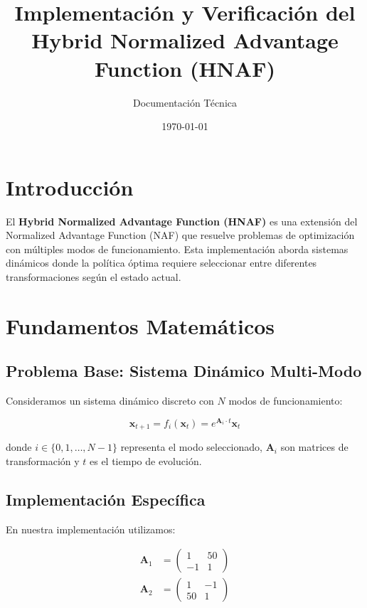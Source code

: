 \documentclass[12pt,a4paper]{article}
\title{\textbf{Implementación y Verificación del\\Hybrid Normalized Advantage Function (HNAF)}}
\author{Documentación Técnica}
\date{\today}
\begin{document}
\maketitle

\tableofcontents
\newpage

\section{Introducción}

El \textbf{Hybrid Normalized Advantage Function (HNAF)} es una extensión del Normalized Advantage Function (NAF) que resuelve problemas de optimización con múltiples modos de funcionamiento. Esta implementación aborda sistemas dinámicos donde la política óptima requiere seleccionar entre diferentes transformaciones según el estado actual.

\section{Fundamentos Matemáticos}

\subsection{Problema Base: Sistema Dinámico Multi-Modo}

Consideramos un sistema dinámico discreto con $N$ modos de funcionamiento:

\begin{equation}
\mathbf{x}_{t+1} = f_i(\mathbf{x}_t) = e^{\mathbf{A}_i \cdot t} \mathbf{x}_t
\end{equation}

donde $i \in \{0, 1, \ldots, N-1\}$ representa el modo seleccionado, $\mathbf{A}_i$ son matrices de transformación y $t$ es el tiempo de evolución.

\subsection{Implementación Específica}

En nuestra implementación utilizamos:

\begin{align}
\mathbf{A}_1 &= \begin{pmatrix} 1 & 50 \\ -1 & 1 \end{pmatrix} \\
\mathbf{A}_2 &= \begin{pmatrix} 1 & -1 \\ 50 & 1 \end{pmatrix}
\end{align}
\end{document}

